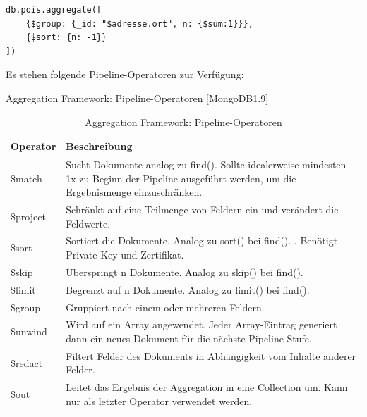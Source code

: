 \begin{lstlisting}[caption=MongoDB Aggregate, label=lst:MongoDBAggregate]
db.pois.aggregate([
    {$group: {_id: "$adresse.ort", n: {$sum:1}}},
    {$sort: {n: -1}}
])
\end{lstlisting}


Es stehen folgende Pipeline-Operatoren zur Verfügung:

 

\begin{table}[tbt]
\caption[Aggregation Framework: Pipeline-Operatoren]{Aggregation Framework: Pipeline-Operatoren [MongoDB1.9]}
\begin{center}
    \begin{tabular}{ l  p{12cm}}
    \toprule
    \textbf{Operator}  & \textbf{Beschreibung} \\
    \midrule
\rule{0pt}{17pt}
    \$match &Sucht Dokumente analog zu find(). Sollte idealerweise mindesten 1x zu Beginn der Pipeline ausgeführt werden, um die Ergebnismenge einzuschränken.\\
    
\rule{0pt}{17pt}
    \$project & Schränkt auf eine Teilmenge von Feldern ein und verändert die Feldwerte.  \\
    
\rule{0pt}{17pt}
	\$sort & Sortiert die Dokumente. Analog zu sort() bei find(). .\newline
	Benötigt Private Key und Zertifikat.  \\
	
\rule{0pt}{17pt}
    \$skip & Überspringt n Dokumente. Analog zu skip() bei find().  \\ 
    
\rule{0pt}{17pt}
    \$limit & Begrenzt auf n Dokumente. Analog zu limit() bei find().  \\

\rule{0pt}{17pt}
   \$group   &	Gruppiert nach einem oder mehreren Feldern. \\ 

\rule{0pt}{17pt}
	\$unwind  &	Wird auf ein Array angewendet. Jeder Array-Eintrag generiert dann ein neues Dokument für die nächste Pipeline-Stufe.\\

\rule{0pt}{17pt}
	\$redact  &	Filtert Felder des Dokuments in Abhängigkeit vom Inhalte anderer Felder.\\

\rule{0pt}{17pt}
	\$out  &	Leitet das Ergebnis der Aggregation in eine Collection um. Kann nur als letzter Operator verwendet werden.  \\
    \bottomrule
    \end{tabular}
\end{center}
\caption[Aggregation Framework: Pipeline-Operatoren]{Aggregation Framework: Pipeline-Operatoren \protect \footnotemark}
\end{table}



